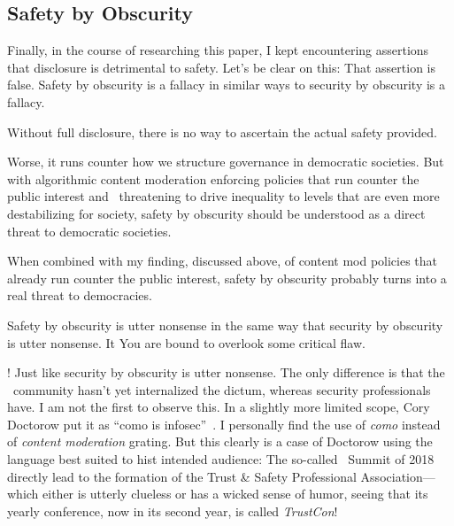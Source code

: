 

\subsection{Safety by Obscurity}

Finally, in the course of researching this paper, I kept encountering assertions
that disclosure is detrimental to safety. Let's be clear on this: That assertion
is false. Safety by obscurity is a fallacy in similar ways to security by
obscurity is a fallacy.

Without full disclosure, there is no way to ascertain
the actual safety provided.

Worse, it runs counter how we structure governance in democratic societies. But
with algorithmic content moderation enforcing policies that run counter the
public interest and \AI\ threatening to drive inequality to levels that are even
more destabilizing for society, safety by obscurity should be understood as a
direct threat to democratic societies.

When
combined with my finding, discussed above, of content mod policies that already run counter
the public interest, safety by obscurity probably turns into a real threat to
democracies.




Safety by obscurity is utter nonsense in the same way that security by
obscurity is utter nonsense. It  You are bound to overlook some critical flaw.


! Just like security by obscurity is utter nonsense. The only difference is that
the \AI\ community hasn't yet internalized the dictum, whereas security
professionals have. I am not the first to observe this. In a slightly more
limited scope, Cory Doctorow put it as ``como is infosec''~\cite{Doctorow2022}.
I personally find the use of \emph{como} instead of \emph{content moderation}
grating. But this clearly is a case of Doctorow using the language best suited
to hist intended audience: The so-called \COMO\ Summit of 2018 directly lead to
the formation of the Trust \& Safety Professional Association---which either is
utterly clueless or has a wicked sense of humor, seeing that its yearly
conference, now in its second year, is called \emph{TrustCon}!

